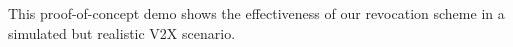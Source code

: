 \documentclass[conference]{IEEEtran}
\begin{document}

This proof-of-concept demo shows the effectiveness of our revocation scheme in a
simulated but realistic \ac{V2X} scenario.




\end{document}
